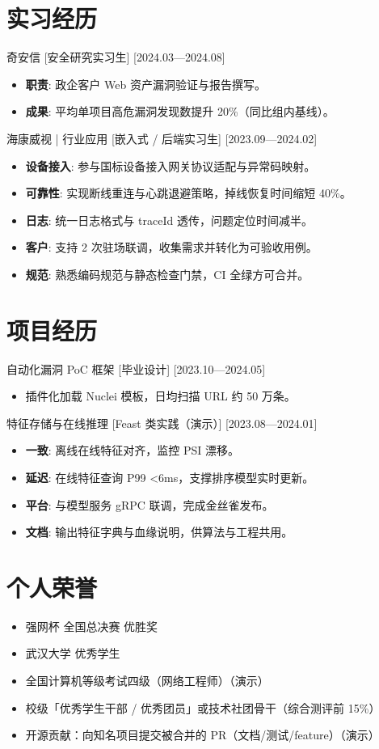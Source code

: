 \documentclass{resume-photo}
\begin{document}
\section{实习经历}
\ResumeItem
{奇安信}
[\textnormal{安全研究实习生}]
[2024.03—2024.08]

\begin{itemize}
  \item \textbf{职责}: 政企客户 Web 资产漏洞验证与报告撰写。
  \item \textbf{成果}: 平均单项目高危漏洞发现数提升 20\%（同比组内基线）。
\end{itemize}


\ResumeItem
{海康威视 | 行业应用}
[\textnormal{嵌入式 / 后端实习生}]
[2023.09—2024.02]

\begin{itemize}
  \item \textbf{设备接入}: 参与国标设备接入网关协议适配与异常码映射。
  \item \textbf{可靠性}: 实现断线重连与心跳退避策略，掉线恢复时间缩短 40\%。
  \item \textbf{日志}: 统一日志格式与 traceId 透传，问题定位时间减半。
  \item \textbf{客户}: 支持 2 次驻场联调，收集需求并转化为可验收用例。
  \item \textbf{规范}: 熟悉编码规范与静态检查门禁，CI 全绿方可合并。
\end{itemize}



\section{项目经历}
\ResumeItem
{自动化漏洞 PoC 框架}
[\textnormal{毕业设计}]
[2023.10—2024.05]

\begin{itemize}
  \item 插件化加载 Nuclei 模板，日均扫描 URL 约 50 万条。
\end{itemize}


\ResumeItem
{特征存储与在线推理}
[\textnormal{Feast 类实践（演示）}]
[2023.08—2024.01]

\begin{itemize}
  \item \textbf{一致}: 离线在线特征对齐，监控 PSI 漂移。
  \item \textbf{延迟}: 在线特征查询 P99 <6ms，支撑排序模型实时更新。
  \item \textbf{平台}: 与模型服务 gRPC 联调，完成金丝雀发布。
  \item \textbf{文档}: 输出特征字典与血缘说明，供算法与工程共用。
\end{itemize}



\section{个人荣誉}
\begin{itemize}
  \item 强网杯 全国总决赛 优胜奖
  \item 武汉大学 优秀学生
  \item 全国计算机等级考试四级（网络工程师）（演示）
  \item 校级「优秀学生干部 / 优秀团员」或技术社团骨干（综合测评前 15\%）
  \item 开源贡献：向知名项目提交被合并的 PR（文档/测试/feature）（演示）
\end{itemize}
\end{document}
